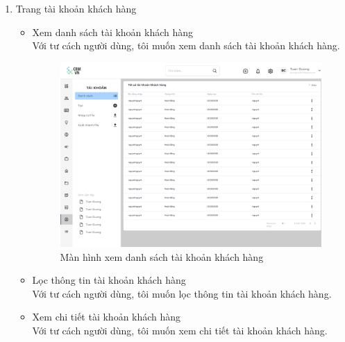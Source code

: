 \documentclass[12pt,a4paper]{article}
\begin{document}
\begin{enumerate}
\begin{itemize}
        \end{itemize}
        \item Trang tài khoản khách hàng
        \begin{itemize}
            \item Xem danh sách tài khoản khách hàng \\
            Với tư cách người dùng, tôi muốn xem danh sách tài khoản khách hàng.


            \begin{figure}[H]
                \centering \includegraphics[width=\textwidth]{Img/Nguyet/TaikhoanKH/ds.png}
                \vspace{0.5cm}
                \caption{Màn hình xem danh sách tài khoản khách hàng }
                \label{dstkk}
            \end{figure}

            \item Lọc thông tin tài khoản khách hàng \\
            Với tư cách người dùng, tôi muốn lọc thông tin tài khoản khách hàng.

            \item Xem chi tiết tài khoản khách hàng \\
            Với tư cách người dùng, tôi muốn xem chi tiết tài khoản khách hàng.


\end{itemize}
\end{enumerate}
\end{document}
